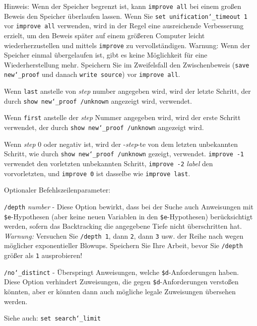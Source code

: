 \begin{sloppypar} %
Hinweis: Wenn der Speicher begrenzt ist, kann \texttt{improve all} bei einem großen Beweis den Speicher überlaufen lassen.  Wenn Sie \texttt{set unification{\char`\_}timeout 1} vor \texttt{improve all} verwenden, wird in der Regel eine ausreichende Verbesserung erzielt, um den Beweis später auf einem größeren Computer leicht wiederherzustellen und mittels \texttt{improve} zu vervollständigen.  Warnung:  Wenn der Speicher einmal übergelaufen ist, gibt es keine Möglichkeit für eine Wiederherstellung mehr.  Speichern Sie im Zweifelsfall den Zwischenbeweis (\texttt{save new{\char`\_}proof} und danach \texttt{write source}) vor \texttt{improve all}.
\end{sloppypar}

Wenn \texttt{last} anstelle von {\em step} number angegeben wird, wird der letzte Schritt, der durch \texttt{show new{\char`\_}proof /unknown} angezeigt wird, verwendet.

Wenn \texttt{first} anstelle der {\em step} Nummer angegeben wird, wird der erste Schritt verwendet, der durch \texttt{show new{\char`\_}proof /unknown} angezeigt wird.

Wenn {\em step} 0 oder negativ ist, wird der -{\em step}-te von dem letzten unbekannten Schritt, wie durch \texttt{show new{\char`\_}proof /unknown} gezeigt, verwendet.  \texttt{improve -1} verwendet den vorletzten unbekannten Schritt, \texttt{improve -2} {\em label} den vorvorletzten, und \texttt{improve 0} ist dasselbe wie \texttt{improve last}.

Optionaler Befehlszeilenparameter:

    \texttt{/depth} {\em number} - Diese Option bewirkt, dass bei der Suche auch Anweisungen mit \texttt{\$e}-Hypothesen (aber keine neuen Variablen in den \texttt{\$e}-Hypothesen) berücksichtigt werden, sofern das Backtracking die angegebene Tiefe nicht überschritten hat. {\em Warnung:}  Versuchen Sie \texttt{/depth 1}, dann \texttt{2}, dann \texttt{3} usw. der Reihe nach wegen möglicher exponentieller Blowups.  Speichern Sie Ihre Arbeit, bevor Sie \texttt{/depth} größer als \texttt{1} ausprobieren!

    \texttt{/no{\char`\_}distinct} - Überspringt Anweisungen, welche \texttt{\$d}-Anforderungen haben. Diese Option verhindert Zuweisungen, die gegen \texttt{\$d}-Anforderungen verstoßen könnten, aber er könnten dann auch mögliche legale Zuweisungen übersehen werden.

Siehe auch: \texttt{set search{\char`\_}limit}

